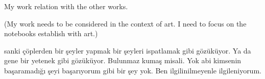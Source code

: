 



My work relation with the other works.

(My work needs to be considered in the context of art. I need to focus on the notebooks establish with art.)

sanki çöplerden bir şeyler yapmak bir şeyleri ispatlamak gibi gözüküyor. Ya da gene bir yetenek gibi gözüküyor. Bulunmaz kumaş misali. Yok abi kimsenin başaramadığı şeyi başarıyorum gibi bir şey yok. Ben ilgilinilmeyenle ilgileniyorum.

